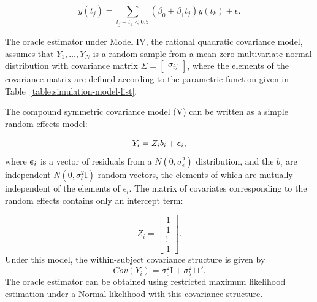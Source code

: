 \begin{equation} \label{eq:model-3-oracle-model}
y\left(t_j\right) = \sum_{ t_j - t_k < 0.5} \left(\beta_0 + \beta_1 t_j\right) y\left( t_k \right) + \epsilon. 
\end{equation}

The oracle estimator under Model IV, the rational quadratic covariance model, assumes that $Y_1, \dots, Y_N$ is a random sample from a mean zero multivariate normal distribution with covariance matrix $\Sigma = \begin{bmatrix} \sigma_{ij} \end{bmatrix}$, where the elements of the covariance matrix are defined according to the parametric function given in Table~\ref{table:simulation-model-list}.

\bigskip

The compound symmetric covariance model (V) can be written as a simple random effects model:

\begin{equation} \label{eq:model-5-oracle-model}
Y_i = Z_i b_i + \mbox{\boldmath $\epsilon$}_i,
\end{equation}
\noindent
where $\mbox{\boldmath $\epsilon$}_i$ is a vector of residuals from a $N\left(0,\sigma_\epsilon^2\right)$ distribution, and the $b_i$ are independent $N\left(0,\sigma_b^2 \mathrm{I}\right)$ random vectors, the elements of which are mutually independent of the elements of $\epsilon_{i}$. The matrix of covariates corresponding to the random effects contains only an intercept term:

\[
Z_i = \begin{bmatrix}  1 \\ 1 \\ \vdots \\1 \end{bmatrix}.
\]
\noindent
Under this model, the within-subject covariance structure is given by
\[
Cov\left(Y_i\right) = \sigma_\epsilon^2 \mathrm{I} +  \sigma_b^2 1 1'. 
\]
\noindent
The oracle estimator can be obtained using restricted maximum likelihood estimation under a Normal likelihood with this covariance structure.

%


